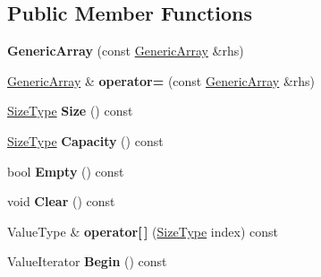 \subsection*{Public Member Functions}
\begin{DoxyCompactItemize}
\item 
{\bfseries Generic\+Array} (const \hyperlink{classGenericArray}{Generic\+Array} \&rhs)\hypertarget{classGenericArray_aa589d897a194b349d5053391a6f1491d}{}\label{classGenericArray_aa589d897a194b349d5053391a6f1491d}

\item 
\hyperlink{classGenericArray}{Generic\+Array} \& {\bfseries operator=} (const \hyperlink{classGenericArray}{Generic\+Array} \&rhs)\hypertarget{classGenericArray_addbff152092d0998b2c550bd575f4b83}{}\label{classGenericArray_addbff152092d0998b2c550bd575f4b83}

\item 
\hyperlink{rapidjson_8h_a5ed6e6e67250fadbd041127e6386dcb5}{Size\+Type} {\bfseries Size} () const \hypertarget{classGenericArray_a9666a5feb3fccbcec330b53742d00371}{}\label{classGenericArray_a9666a5feb3fccbcec330b53742d00371}

\item 
\hyperlink{rapidjson_8h_a5ed6e6e67250fadbd041127e6386dcb5}{Size\+Type} {\bfseries Capacity} () const \hypertarget{classGenericArray_a12717a6bcd3949dea08ae19a9e940d58}{}\label{classGenericArray_a12717a6bcd3949dea08ae19a9e940d58}

\item 
bool {\bfseries Empty} () const \hypertarget{classGenericArray_a85c783f2f31684901cc2fbf178b1aba5}{}\label{classGenericArray_a85c783f2f31684901cc2fbf178b1aba5}

\item 
void {\bfseries Clear} () const \hypertarget{classGenericArray_a9a67311453f8941f0ac1b5471ec6b99f}{}\label{classGenericArray_a9a67311453f8941f0ac1b5471ec6b99f}

\item 
Value\+Type \& {\bfseries operator\mbox{[}$\,$\mbox{]}} (\hyperlink{rapidjson_8h_a5ed6e6e67250fadbd041127e6386dcb5}{Size\+Type} index) const \hypertarget{classGenericArray_ac928627968bcfff4746f04c2cdd103ef}{}\label{classGenericArray_ac928627968bcfff4746f04c2cdd103ef}

\item 
Value\+Iterator {\bfseries Begin} () const \hypertarget{classGenericArray_a04cb899ae93f89ba91fab09381d731d3}{}\label{classGenericArray_a04cb899ae93f89ba91fab09381d731d3}


\end{DoxyCompactItemize}
